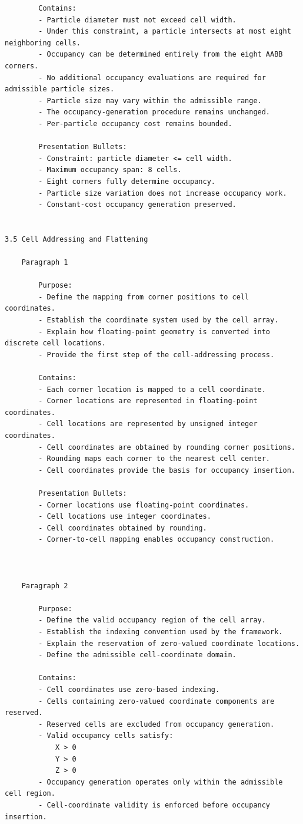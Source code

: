 \begin{verbatim}
		Contains:
		- Particle diameter must not exceed cell width.
		- Under this constraint, a particle intersects at most eight neighboring cells.
		- Occupancy can be determined entirely from the eight AABB corners.
		- No additional occupancy evaluations are required for admissible particle sizes.
		- Particle size may vary within the admissible range.
		- The occupancy-generation procedure remains unchanged.
		- Per-particle occupancy cost remains bounded.

		Presentation Bullets:
		- Constraint: particle diameter <= cell width.
		- Maximum occupancy span: 8 cells.
		- Eight corners fully determine occupancy.
		- Particle size variation does not increase occupancy work.
		- Constant-cost occupancy generation preserved.


3.5 Cell Addressing and Flattening

	Paragraph 1

		Purpose:
		- Define the mapping from corner positions to cell coordinates.
		- Establish the coordinate system used by the cell array.
		- Explain how floating-point geometry is converted into discrete cell locations.
		- Provide the first step of the cell-addressing process.

		Contains:
		- Each corner location is mapped to a cell coordinate.
		- Corner locations are represented in floating-point coordinates.
		- Cell locations are represented by unsigned integer coordinates.
		- Cell coordinates are obtained by rounding corner positions.
		- Rounding maps each corner to the nearest cell center.
		- Cell coordinates provide the basis for occupancy insertion.

		Presentation Bullets:
		- Corner locations use floating-point coordinates.
		- Cell locations use integer coordinates.
		- Cell coordinates obtained by rounding.
		- Corner-to-cell mapping enables occupancy construction.



	Paragraph 2

		Purpose:
		- Define the valid occupancy region of the cell array.
		- Establish the indexing convention used by the framework.
		- Explain the reservation of zero-valued coordinate locations.
		- Define the admissible cell-coordinate domain.

		Contains:
		- Cell coordinates use zero-based indexing.
		- Cells containing zero-valued coordinate components are reserved.
		- Reserved cells are excluded from occupancy generation.
		- Valid occupancy cells satisfy:
			X > 0
			Y > 0
			Z > 0
		- Occupancy generation operates only within the admissible cell region.
		- Cell-coordinate validity is enforced before occupancy insertion.


\end{verbatim}
